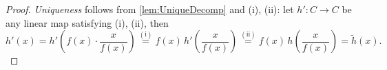 \documentclass[10pt,a4paper]{amsart}
\begin{document}
\begin{proof}
\noindent \emph{Uniqueness} follows from \cref{lem:UniqueDecomp} and (i), (ii):
let $h': C \rightarrow C$ be any linear map satisfying (i), (ii), then
\begin{equation*}
	h'(x) = h'\!\left(f(x)\cdot\frac{x}{f(x)}\right) 
	\overset{(\mathrm{i})}{=} f(x)\, h'\!\left(\frac{x}{f(x)}\right) 
	\overset{(\mathrm{ii})}{=} f(x)\, h\!\left(\frac{x}{f(x)}\right) = \tilde h(x).
\end{equation*}
\end{proof}
\end{document}
